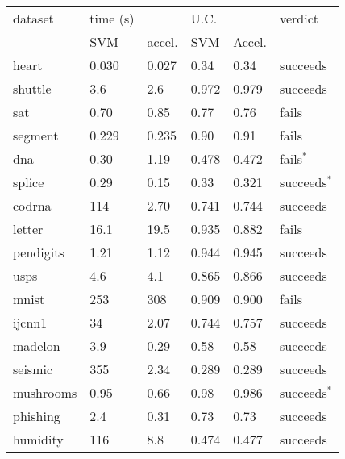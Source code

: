 \begin{tabular}{|l|ll|ll|l|}
	\hline
dataset & time (s) & & U.C. & & verdict \\
 & SVM & accel. & SVM & Accel. & \\
	\hline
heart & 0.030 & 0.027 & 0.34 & 0.34 & succeeds \\
shuttle & 3.6 & 2.6 & 0.972 & 0.979 & succeeds \\
	sat & 0.70 & 0.85 & 0.77 & 0.76 & fails \\
segment & 0.229 & 0.235 & 0.90 & 0.91 & fails \\
	dna & 0.30 & 1.19 & 0.478 & 0.472 & fails$^*$ \\
	splice & 0.29 & 0.15 & 0.33 & 0.321 & succeeds$^*$ \\
	codrna & 114 & 2.70 & 0.741 & 0.744 & succeeds \\
	letter & 16.1 & 19.5 & 0.935 & 0.882 & fails \\
	pendigits & 1.21 & 1.12 & 0.944 & 0.945 & succeeds \\
	usps & 4.6 & 4.1 & 0.865 & 0.866 & succeeds \\
	mnist & 253 & 308 & 0.909 & 0.900 & fails \\
	ijcnn1 & 34 & 2.07 & 0.744 & 0.757 & succeeds \\
	madelon & 3.9 & 0.29 & 0.58 & 0.58 & succeeds \\
	seismic & 355 & 2.34 & 0.289 & 0.289 & succeeds \\
	mushrooms & 0.95 & 0.66 & 0.98 & 0.986 & succeeds$^*$ \\
	phishing & 2.4 & 0.31 & 0.73 & 0.73 & succeeds \\
	humidity & 116 & 8.8 & 0.474 & 0.477 & succeeds \\
	\hline
\end{tabular}
